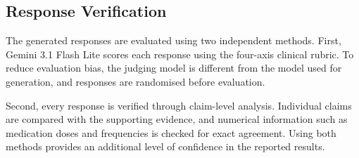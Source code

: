 \subsection{Response Verification}

The generated responses are evaluated using two independent methods. First, Gemini 3.1 Flash Lite scores each response using the four-axis clinical rubric. To reduce evaluation bias, the judging model is different from the model used for generation, and responses are randomised before evaluation.

Second, every response is verified through claim-level analysis. Individual claims are compared with the supporting evidence, and numerical information such as medication doses and frequencies is checked for exact agreement. Using both methods provides an additional level of confidence in the reported results.
